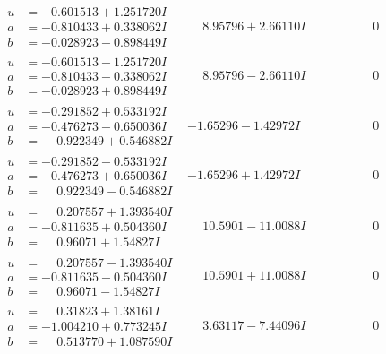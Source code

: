 \documentclass[1p]{elsarticle_modified}
\theoremstyle{definition}
\begin{document}
$$\begin{array}{c|c|c}
\begin{aligned}
u &= -0.601513 + 1.251720 I \\
a &= -0.810433 + 0.338062 I \\
b &= -0.028923 - 0.898449 I\end{aligned}
 & \phantom{-}8.95796 + 2.66110 I & \phantom{-0.000000 } 0 \\ \hline\begin{aligned}
u &= -0.601513 - 1.251720 I \\
a &= -0.810433 - 0.338062 I \\
b &= -0.028923 + 0.898449 I\end{aligned}
 & \phantom{-}8.95796 - 2.66110 I & \phantom{-0.000000 } 0 \\ \hline\begin{aligned}
u &= -0.291852 + 0.533192 I \\
a &= -0.476273 - 0.650036 I \\
b &= \phantom{-}0.922349 + 0.546882 I\end{aligned}
 & -1.65296 - 1.42972 I & \phantom{-0.000000 } 0 \\ \hline\begin{aligned}
u &= -0.291852 - 0.533192 I \\
a &= -0.476273 + 0.650036 I \\
b &= \phantom{-}0.922349 - 0.546882 I\end{aligned}
 & -1.65296 + 1.42972 I & \phantom{-0.000000 } 0 \\ \hline\begin{aligned}
u &= \phantom{-}0.207557 + 1.393540 I \\
a &= -0.811635 + 0.504360 I \\
b &= \phantom{-}0.96071 + 1.54827 I\end{aligned}
 & \phantom{-}10.5901 - 11.0088 I & \phantom{-0.000000 } 0 \\ \hline\begin{aligned}
u &= \phantom{-}0.207557 - 1.393540 I \\
a &= -0.811635 - 0.504360 I \\
b &= \phantom{-}0.96071 - 1.54827 I\end{aligned}
 & \phantom{-}10.5901 + 11.0088 I & \phantom{-0.000000 } 0 \\ \hline\begin{aligned}
u &= \phantom{-}0.31823 + 1.38161 I \\
a &= -1.004210 + 0.773245 I \\
b &= \phantom{-}0.513770 + 1.087590 I\end{aligned}
 & \phantom{-}3.63117 - 7.44096 I & \phantom{-0.000000 } 0 \\ \hline\begin{aligned}

\end{aligned}
\end{array}$$
\end{document}
